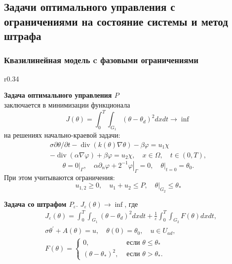 \subsection{Задачи оптимального управления с ограничениями на состояние системы и метод штрафа}\label{subsec:opt-phase}
\begin{frame}
    \frametitle{Квазилинейная модель c фазовыми ограничениями}
    \begin{wrapfigure}{r}{0.34\textwidth}
    \end{wrapfigure}

    \textbf{Задача оптимального управления $P$} \\
    заключается в минимизации функционала
    \[ J(\theta)=\int_{0}^{T} \int_{G_{1}}\left(\theta-\theta_{d}\right)^{2} dx dt \rightarrow \inf \]
    на решениях начально-краевой задачи:
    \begin{equation}
        \label{eq:3_2:1}
        \begin{gathered}
            \sigma \partial \theta / \partial t-\operatorname{div}(k(\theta)
            \nabla \theta)-\beta \varphi=u_{1} \chi \\
            -\operatorname{div}(\alpha \nabla \varphi)+\beta \varphi=u_{2}
            \chi, \quad x \in \Omega, \quad t \in(0, T),
        \end{gathered}
    \end{equation}
    \begin{equation}
        \label{eq:3_2:2}
        \theta=\left.0\right|_{\Gamma},
        \quad \alpha \partial_{n} \varphi
        +\left.2^{-1} \varphi\right|_{\Gamma}=0,
        \left.\quad \theta\right|_{t=0}=\theta_{0}.
    \end{equation}
    При этом учитываются ограничения:
    \[ u_{1,2} \geq 0, \quad u_{1}+u_{2} \leq P, \left.\quad \theta\right|_{G_{2}} \leq \theta_{*} \]

    \textbf{Задача со штрафом $P_{\varepsilon}$}.
    $J_{\varepsilon}(\theta) \rightarrow \inf$, где
    \[
        \begin{aligned}
            & J_{\varepsilon}(\theta)=\int_{0}^{T}
            \int_{G_{1}}\left(\theta-\theta_{d}\right)^{2} dx dt
            +\frac{1}{\varepsilon} \int_{0}^{T}
            \int_{G_{2}} F(\theta) d x d t, \\
            & \sigma \theta^{\prime}+A(\theta)=u,
            \quad \theta(0)=\theta_{0}, \quad u \in U_{a d},\\
            &F(\theta)=
            \begin{cases}
                0, & \text { если } \theta \leq \theta_{*} \\
                \left(\theta-\theta_{*}\right)^{2},
                & \text { если } \theta>\theta_{*}.
            \end{cases}
        \end{aligned}
    \]

\end{frame}
